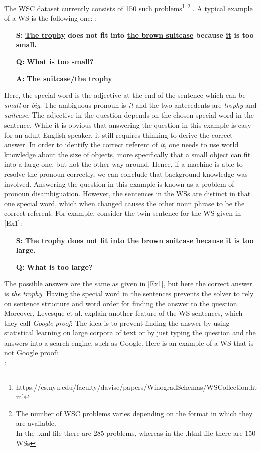 The WSC dataset currently consists of 150 such problems\footnote{https://cs.nyu.edu/faculty/davise/papers/WinogradSchemas/WSCollection.html} \footnote{The number of WSC problems varies depending on the format in which they are available.\\In the .xml file there are 285 problems, whereas in the .html file there are 150 WSs} .
A typical example of a WS is the following one:
:
\begin{itemize} 
	\item[\textbf{S:}] \textbf{\underline{The trophy} does not fit into \underline{the brown suitcase} because \underline{it} is too small.}
	\item[\textbf{Q:}] \textbf{What is too small?}
	\item[\textbf{A:}] \textbf{\underline{The suitcase}/the trophy}
\end{itemize}

Here, the special word is the adjective at the end of the sentence which can be \textit{small} or \textit{big}. The ambiguous pronoun is \textit{it} and the two antecedents are \textit{trophy} and \textit{suitcase}. The adjective in the question depends on the chosen special word in the sentence. While it is obvious that answering the question in this example is easy for an adult English speaker, it still requires thinking to derive the correct answer. In order to identify the correct referent of \textit{it}, one needs to use world knowledge about the size of objects, more specifically that a small object can fit into a large one, but not the other way around. Hence, if a machine is able to resolve the pronoun correctly, we can conclude that background knowledge was involved. Answering the question in this example is known as a problem of pronoun disambiguation. However, the sentences in the WSs are distinct in that one special word, which when changed causes the other noun phrase to be the correct referent. For example, consider the twin sentence for the WS given in \ref{Ex1}:
\begin{itemize} 
	\item[\textbf{S:}] \textbf{\underline{The trophy} does not fit into the brown suitcase because \underline{it} is too large.}
	\item[\textbf{Q:}] \textbf{What is too large?}
\end{itemize}

The possible answers are the same as given in \ref{Ex1}, but here the correct answer is \textit{the trophy}. Having the special word in the sentences prevents the solver to rely on sentence structure and word order for finding the answer to the question. 
Moreover, Levesque et al. \cite{DBLP:conf/kr/LevesqueDM12} explain another feature of the WS sentences, which they call \textit{Google proof}: The idea is to prevent finding the answer by using statistical learning on large corpora of text or by just typing the question and the answers into a search engine, such as Google. 
Here is an example of a WS that is not Google proof:\\
:

